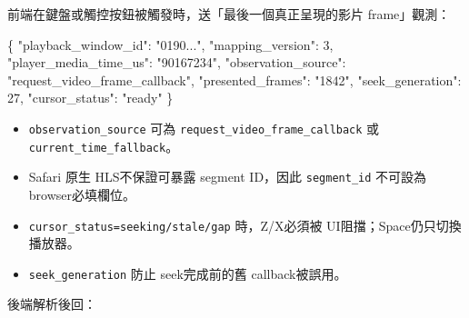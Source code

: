 \documentclass[
  9pt,
  a4paper,
]{article}
\newenvironment{Shaded}{}{}
\newcommand{\DataTypeTok}[1]{\textcolor[rgb]{0.56,0.13,0.00}{#1}}
\newcommand{\DecValTok}[1]{\textcolor[rgb]{0.25,0.63,0.44}{#1}}
\newcommand{\FunctionTok}[1]{\textcolor[rgb]{0.02,0.16,0.49}{#1}}
\newcommand{\StringTok}[1]{\textcolor[rgb]{0.25,0.44,0.63}{#1}}
\providecommand{\tightlist}{%
  \setlength{\itemsep}{0pt}\setlength{\parskip}{0pt}}
\begin{document}
前端在鍵盤或觸控按鈕被觸發時，送「最後一個真正呈現的影片 frame」觀測：

\begin{Shaded}
\begin{Highlighting}[]
\FunctionTok{\{}
  \DataTypeTok{"playback\_\allowbreak{}window\_\allowbreak{}id"}\FunctionTok{:} \StringTok{"0190..."}\FunctionTok{,}
  \DataTypeTok{"mapping\_\allowbreak{}version"}\FunctionTok{:} \DecValTok{3}\FunctionTok{,}
  \DataTypeTok{"player\_\allowbreak{}media\_\allowbreak{}time\_\allowbreak{}us"}\FunctionTok{:} \StringTok{"90167234"}\FunctionTok{,}
  \DataTypeTok{"observation\_\allowbreak{}source"}\FunctionTok{:} \StringTok{"request\_\allowbreak{}video\_\allowbreak{}frame\_\allowbreak{}callback"}\FunctionTok{,}
  \DataTypeTok{"presented\_\allowbreak{}frames"}\FunctionTok{:} \StringTok{"1842"}\FunctionTok{,}
  \DataTypeTok{"seek\_\allowbreak{}generation"}\FunctionTok{:} \DecValTok{27}\FunctionTok{,}
  \DataTypeTok{"cursor\_\allowbreak{}status"}\FunctionTok{:} \StringTok{"ready"}
\FunctionTok{\}}
\end{Highlighting}
\end{Shaded}

\begin{itemize}
\tightlist
\item
  \texttt{observation\_\allowbreak{}source} 可為
  \texttt{request\_\allowbreak{}video\_\allowbreak{}frame\_\allowbreak{}callback} 或
  \texttt{current\_\allowbreak{}time\_\allowbreak{}fallback}。
\item
  Safari 原生 HLS不保證可暴露 segment ID，因此 \texttt{segment\_\allowbreak{}id}
  不可設為 browser必填欄位。
\item
  \texttt{cursor\_\allowbreak{}status=seeking/stale/gap} 時，Z/X必須被 UI阻擋；Space仍只切換播放器。
\item
  \texttt{seek\_\allowbreak{}generation} 防止 seek完成前的舊 callback被誤用。
\end{itemize}

後端解析後回：
\end{document}
